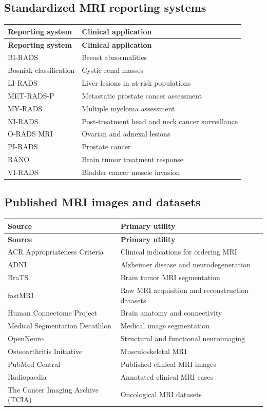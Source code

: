\subsection{Standardized MRI reporting systems}
\begin{longtable}{@{}p{}p{}@{}}
\toprule
\textbf{Reporting system} & \textbf{Clinical application} \\
\midrule
\endfirsthead
\toprule
\textbf{Reporting system} & \textbf{Clinical application} \\
\midrule
\endhead
BI-RADS & Breast abnormalities \\
Bosniak classification & Cystic renal masses \\
LI-RADS & Liver lesions in at-risk populations \\
MET-RADS-P & Metastatic prostate cancer assessment \\
MY-RADS & Multiple myeloma assessment \\
NI-RADS & Post-treatment head and neck cancer surveillance \\
O-RADS MRI & Ovarian and adnexal lesions \\
PI-RADS & Prostate cancer \\
RANO & Brain tumor treatment response \\
VI-RADS & Bladder cancer muscle invasion \\
\bottomrule
\end{longtable}

\subsection{Published MRI images and datasets}
\begin{longtable}{@{}p{}p{}@{}}
\toprule
\textbf{Source} & \textbf{Primary utility} \\
\midrule
\endfirsthead
\toprule
\textbf{Source} & \textbf{Primary utility} \\
\midrule
\endhead
ACR Appropriateness Criteria & Clinical indications for ordering MRI \\
ADNI & Alzheimer disease and neurodegeneration \\
BraTS & Brain tumor MRI segmentation \\
fastMRI & Raw MRI acquisition and reconstruction datasets \\
Human Connectome Project & Brain anatomy and connectivity \\
Medical Segmentation Decathlon & Medical image segmentation \\
OpenNeuro & Structural and functional neuroimaging \\
Osteoarthritis Initiative & Musculoskeletal MRI \\
PubMed Central & Published clinical MRI images \\
Radiopaedia & Annotated clinical MRI cases \\
The Cancer Imaging Archive (TCIA) & Oncological MRI datasets \\
\bottomrule
\end{longtable}

